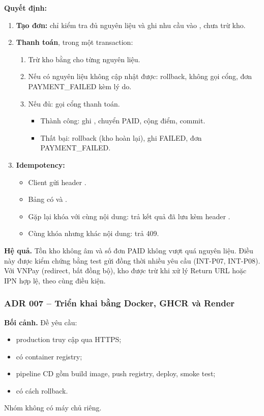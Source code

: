 \textbf{Quyết định:}
\begin{enumerate}
\item \textbf{Tạo đơn:} chỉ kiểm tra đủ nguyên liệu và ghi nhu cầu vào , chưa trừ kho.
\item \textbf{Thanh toán}, trong một transaction:
  \begin{enumerate}
  \item Trừ kho bằng  cho từng nguyên liệu.
  \item Nếu có nguyên liệu không cập nhật được: rollback, không gọi cổng, đơn PAYMENT\_FAILED kèm lý do.
  \item Nếu đủ: gọi cổng thanh toán.
    \begin{itemize}
    \item Thành công: ghi , chuyển PAID, cộng điểm, commit.
    \item Thất bại: rollback (kho hoàn lại), ghi  FAILED, đơn PAYMENT\_FAILED.
    \end{itemize}
  \end{enumerate}
\item \textbf{Idempotency:}
  \begin{itemize}
  \item Client gửi header .
  \item Bảng  có  và .
  \item Gặp lại khóa với cùng nội dung: trả kết quả đã lưu kèm header .
  \item Cùng khóa nhưng khác nội dung: trả 409.
  \end{itemize}
\end{enumerate}

\textbf{Hệ quả.} Tồn kho không âm và số đơn PAID không vượt quá nguyên liệu. Điều này được kiểm chứng bằng test gửi đồng thời nhiều yêu cầu (INT-P07, INT-P08). Với VNPay (redirect, bất đồng bộ), kho được trừ khi xử lý Return URL hoặc IPN hợp lệ, theo cùng điều kiện.

\subsubsection{ADR 007 -- Triển khai bằng Docker, GHCR và Render}
\textbf{Bối cảnh.} Đề yêu cầu:
\begin{itemize}
\item production truy cập qua HTTPS;
\item có container registry;
\item pipeline CD gồm build image, push registry, deploy, smoke test;
\item có cách rollback.
\end{itemize}
Nhóm không có máy chủ riêng.


